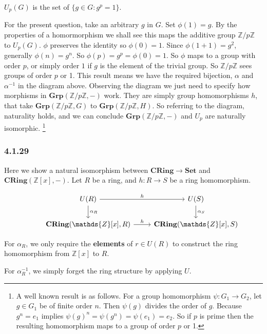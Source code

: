 \documentclass{article}
\begin{document}
$U_p(G)$ is the set of $\{g \in G\colon g^p = 1\}$.

For the present question, take an arbitrary $g$ in $G$. Set $\phi(1) = g$. By the properties of a homormorphism we shall see this maps the additive group $\mathds{Z}/p\mathds{Z}$ to $U_p(G)$. $\phi$ preserves the identity so $\phi(0) = 1$. Since $\phi(1 + 1) = g^2$, generally $\phi(n) = g^n$. So $\phi(p) = g^p = \phi(0) = 1$. So $\phi$ maps to a group with order $p$, or simply order $1$ if $g$ is the element of the trivial group. So $\mathds{Z}/p\mathds{Z}$ sees groups of order $p$ or 1. This result means we have the required bijection, $\alpha$ and $\alpha^{-1}$ in the diagram above. Observing the diagram we just need to specify how morphisms in $\mathbf{Grp}(\mathds{Z}/p\mathds{Z}, -)$ work. They are simply group homomorphisms $h$, that take $\mathbf{Grp}(\mathds{Z}/p\mathds{Z}, G)$ to $\mathbf{Grp}(\mathds{Z}/p\mathds{Z}, H)$. So referring to the diagram, naturality holds, and we can conclude $\mathbf{Grp}(\mathds{Z}/p\mathds{Z}, -)$ and $U_p$ are naturally isomorphic. \footnote{A well known result is as follows. For a group homomorphism $\psi: G_1 \rightarrow G_2$, let $g \in G_1$ be of finite order $n$. Then $\psi(g)$ divides the order of $g$. Because $g^n = e_1$ implies $\psi(g)^n = \psi(g^n) = \psi(e_1) = e_2$. So if $p$ is prime then the resulting homomorphism maps to a group of order $p$ or 1.}

\subsubsection*{4.1.29}

Here we show a natural isomorphism between $\mathbf{CRing} \rightarrow \mathbf{Set}$ and $\mathbf{CRing}(\mathds{Z}[x],\mathit{-})$. Let $R$ be a ring, and $h\colon R \rightarrow S$ be a ring homomorphism.

\begin{equation*}
\begin{tikzcd}
  & U(R) \arrow[d,"\alpha_R"] \arrow[r, "h"] & U(S) \arrow[d,"\alpha_S"] \\
  & \mathbf{CRing}(\mathds{Z}[x], R) \arrow[r,"h"] & \mathbf{CRing}(\mathds{Z}[x], S)
\end{tikzcd}
\end{equation*}

For $\alpha_R$, we only require the \textbf{elements} of $r \in U(R)$ to construct the ring homomorphism from $\mathds{Z}[x]$ to $R$.

For $\alpha_R^{-1}$, we simply forget the ring structure by applying $U$.
\end{document}
